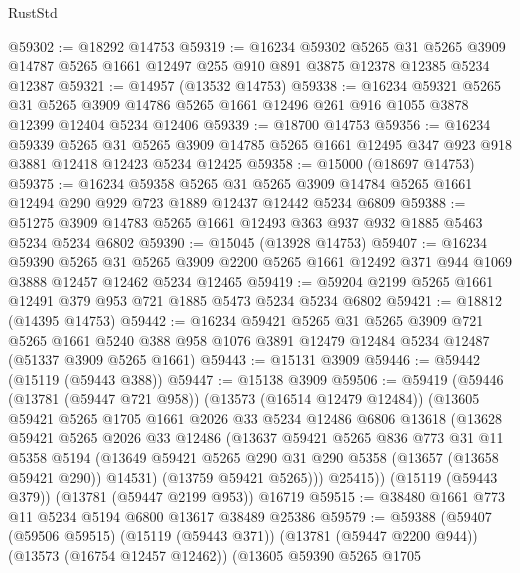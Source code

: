 \begin{lexlean}{RustStd}
\begin{coremodule}
@59302 := @18292 @14753
@59319 := @16234
    @59302
    @5265
    @31
    @5265
    @3909
    @14787
    @5265
    @1661
    @12497
    @255
    @910
    @891
    @3875
    @12378
    @12385
    @5234
    @12387
@59321 := @14957 (@13532 @14753)
@59338 := @16234
    @59321
    @5265
    @31
    @5265
    @3909
    @14786
    @5265
    @1661
    @12496
    @261
    @916
    @1055
    @3878
    @12399
    @12404
    @5234
    @12406
@59339 := @18700 @14753
@59356 := @16234
    @59339
    @5265
    @31
    @5265
    @3909
    @14785
    @5265
    @1661
    @12495
    @347
    @923
    @918
    @3881
    @12418
    @12423
    @5234
    @12425
@59358 := @15000 (@18697 @14753)
@59375 := @16234
    @59358
    @5265
    @31
    @5265
    @3909
    @14784
    @5265
    @1661
    @12494
    @290
    @929
    @723
    @1889
    @12437
    @12442
    @5234
    @6809
@59388 := @51275 @3909 @14783 @5265 @1661 @12493 @363 @937 @932 @1885 @5463 @5234 @5234 @6802
@59390 := @15045 (@13928 @14753)
@59407 := @16234
    @59390
    @5265
    @31
    @5265
    @3909
    @2200
    @5265
    @1661
    @12492
    @371
    @944
    @1069
    @3888
    @12457
    @12462
    @5234
    @12465
@59419 := @59204 @2199 @5265 @1661 @12491 @379 @953 @721 @1885 @5473 @5234 @5234 @6802
@59421 := @18812 (@14395 @14753)
@59442 := @16234
    @59421
    @5265
    @31
    @5265
    @3909
    @721
    @5265
    @1661
    @5240
    @388
    @958
    @1076
    @3891
    @12479
    @12484
    @5234
    @12487
    (@51337 @3909 @5265 @1661)
@59443 := @15131 @3909
@59446 := @59442 (@15119 (@59443 @388))
@59447 := @15138 @3909
@59506 := @59419
    (@59446
      (@13781 (@59447 @721 @958))
      (@13573 (@16514 @12479 @12484))
      (@13605
        @59421
        @5265
        @1705
        @1661
        @2026
        @33
        @5234
        @12486
        @6806
        @13618
        (@13628
          @59421
          @5265
          @2026
          @33
          @12486
          (@13637
            @59421
            @5265
            @836
            @773
            @31
            @11
            @5358
            @5194
            (@13649 @59421 @5265 @290 @31 @290 @5358 (@13657 (@13658 @59421 @290)) @14531)
            (@13759 @59421 @5265)))
        @25415))
    (@15119 (@59443 @379))
    (@13781 (@59447 @2199 @953))
    @16719
@59515 := @38480 @1661 @773 @11 @5234 @5194 @6800 @13617 @38489 @25386
@59579 := @59388
    (@59407
      (@59506 @59515)
      (@15119 (@59443 @371))
      (@13781 (@59447 @2200 @944))
      (@13573 (@16754 @12457 @12462))
      (@13605
        @59390
        @5265
        @1705

\end{coremodule}
\end{lexlean}
